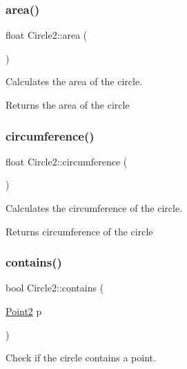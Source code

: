\subsubsection{\texorpdfstring{area()}{area()}}
{\footnotesize\ttfamily float Circle2\+::area (\begin{DoxyParamCaption}{ }\end{DoxyParamCaption})}



Calculates the area of the circle. 

\begin{DoxyReturn}{Returns}
the area of the circle 
\end{DoxyReturn}
\mbox{\label{class_circle2_accd5087218bd9bb180e9073b416c5a8c}} 
\subsubsection{\texorpdfstring{circumference()}{circumference()}}
{\footnotesize\ttfamily float Circle2\+::circumference (\begin{DoxyParamCaption}{ }\end{DoxyParamCaption})}



Calculates the circumference of the circle. 

\begin{DoxyReturn}{Returns}
circumference of the circle 
\end{DoxyReturn}
\mbox{\label{class_circle2_adfff11a508b38dc893d8ed5ba6fbecd7}} 
\subsubsection{\texorpdfstring{contains()}{contains()}\hspace{0.1cm}{\footnotesize\ttfamily [1/2]}}
{\footnotesize\ttfamily bool Circle2\+::contains (\begin{DoxyParamCaption}\item[{\mbox{\hyperlink{class_point2}{Point2}}}]{p }\end{DoxyParamCaption})}



Check if the circle contains a point. 


